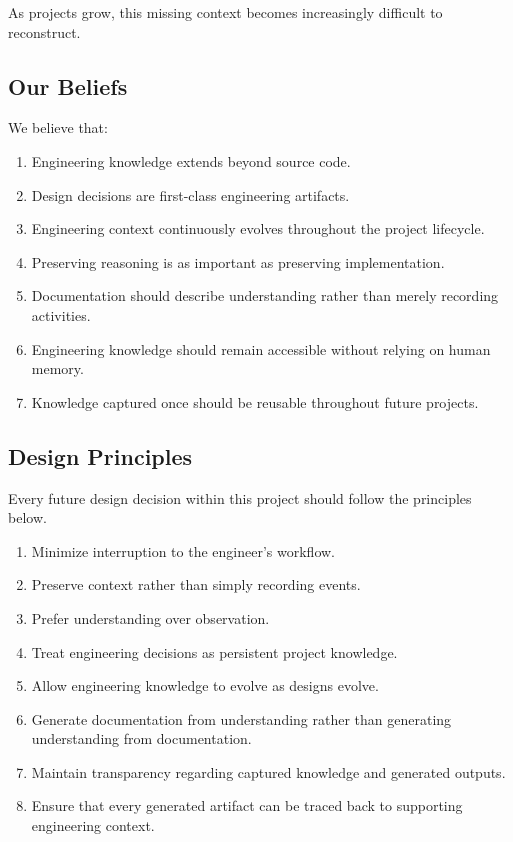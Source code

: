 As projects grow, this missing context becomes increasingly difficult to reconstruct.

\vspace{0.5cm}

\subsection{Our Beliefs}

We believe that:

\begin{enumerate}
    \item Engineering knowledge extends beyond source code.
    \item Design decisions are first-class engineering artifacts.
    \item Engineering context continuously evolves throughout the project lifecycle.
    \item Preserving reasoning is as important as preserving implementation.
    \item Documentation should describe understanding rather than merely recording activities.
    \item Engineering knowledge should remain accessible without relying on human memory.
    \item Knowledge captured once should be reusable throughout future projects.
\end{enumerate}

\vspace{0.5cm}

\subsection{Design Principles}

Every future design decision within this project should follow the principles below.

\begin{enumerate}
    \item Minimize interruption to the engineer's workflow.
    \item Preserve context rather than simply recording events.
    \item Prefer understanding over observation.
    \item Treat engineering decisions as persistent project knowledge.
    \item Allow engineering knowledge to evolve as designs evolve.
    \item Generate documentation from understanding rather than generating understanding from documentation.
    \item Maintain transparency regarding captured knowledge and generated outputs.
    \item Ensure that every generated artifact can be traced back to supporting engineering context.
\end{enumerate}

